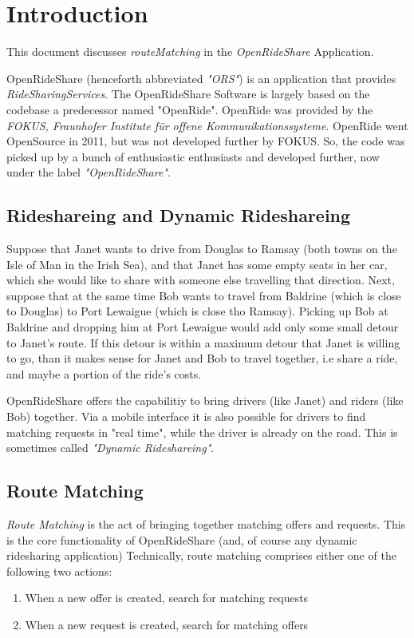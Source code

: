 
\chapter{Introduction}

This document discusses \emph{routeMatching} in the \emph{OpenRideShare} Application.

OpenRideShare (henceforth abbreviated \emph{"ORS"}) is an application that provides \emph{RideSharingServices}.
The OpenRideShare Software is largely based on the codebase a predecessor named "OpenRide". OpenRide was provided by 
the \emph{FOKUS, Fraunhofer Institute f\"ur offene Kommunikationssysteme}. OpenRide went OpenSource in 2011, but
was not developed further by FOKUS. So, the code was picked up by a bunch of enthusiastic enthusiasts and developed 
further, now under the label \emph{"OpenRideShare"}. 

\section{Rideshareing and Dynamic Rideshareing}

Suppose that Janet wants to drive from  Douglas to  Ramsay (both towns on the Isle of Man in the Irish Sea),
and that Janet has some empty seats in her car, which she would like to share with someone else travelling  that direction.
Next, suppose that at the same time Bob wants to travel from Baldrine (which is close to Douglas) to Port Lewaigue 
(which is close tho Ramsay).
Picking up Bob at Baldrine and dropping him at Port Lewaigue would add only some small detour to Janet's route. 
If this detour is within a maximum detour that Janet is willing to go, than it makes sense for Janet  
and  Bob to travel together, i.e share a ride, and maybe a portion of the ride's costs.

OpenRideShare offers the capabilitiy to bring drivers (like Janet) and riders (like Bob) together.
Via a mobile interface it is also possible for drivers to find matching requests in "real time", while 
the driver is already on the road. This is sometimes called \emph{"Dynamic Rideshareing"}.

\section{Route Matching}
\emph{Route Matching} is the act of bringing together matching offers and requests. 
This is the core functionality of OpenRideShare (and, of course any dynamic ridesharing application)
Technically, route matching comprises either one of the following two actions:
\label{routeMatchingIntroduction}
\begin{enumerate}
\item{When a new offer is created, search for matching requests }
\item{When a new request is created, search for matching offers}
\end{enumerate}


